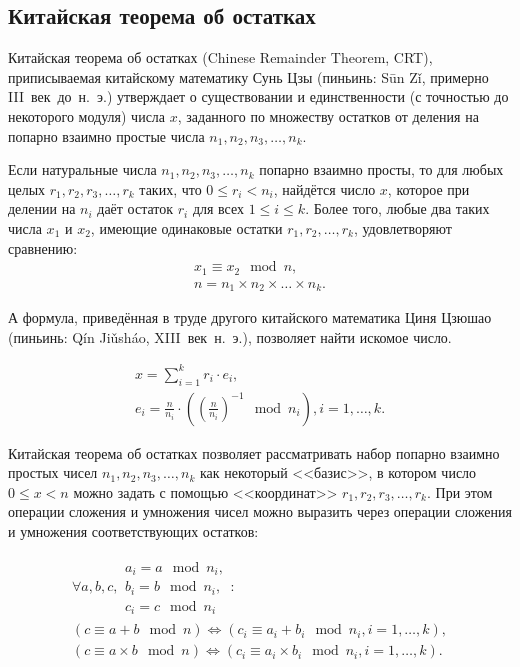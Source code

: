 \subsection{Китайская теорема об остатках}\label{section-chinese-remainder-theorem}

Китайская теорема об остатках (Chinese Remainder Theorem, CRT), приписываемая китайскому математику Сунь Цзы (пиньинь: S\={u}n Z\v{i}, примерно III~век~до~н.~э.) утверждает о существовании и единственности (с точностью до некоторого модуля) числа $x$, заданного по множеству остатков от деления на попарно взаимно простые числа $n_1, n_2, n_3, \dots, n_k$.

\begin{theorem} Если натуральные числа $n_1, n_2, n_3, \dots, n_k$ попарно взаимно просты, то для любых целых $r_1, r_2, r_3, \dots, r_k$ таких, что $0 \leq r_i < n_i$, найдётся число $x$, которое при делении на $n_i$ даёт остаток $r_i$ для всех $1 \leq i \leq k$. Более того, любые два таких числа $x_1$ и $x_2$, имеющие одинаковые остатки $r_1, r_2, \dots, r_k$, удовлетворяют сравнению:
\[ \begin{array}{l}
	x_1 \equiv x_2 \mod n, \\
	n = n_1 \times n_2 \times \dots \times n_k.
\end{array} \]
\end{theorem}

А формула, приведённая в труде другого китайского математика Циня Цзюшао (пиньинь: Q\'{i}n Ji\v{u}sh\'{a}o, XIII~век~н.~э.), позволяет найти искомое число.

\[ \begin{array}{l}
	x = \sum\limits_{i=1}^k r_i \cdot e_i, \\
	e_i = \frac{n}{n_i} \cdot \left( \left(\frac{n}{n_i}\right)^{-1} \mod n_i \right), i = 1, \dots, k.
\end{array} \]

Китайская теорема об остатках позволяет рассматривать набор попарно взаимно простых чисел $n_1, n_2, n_3, \dots, n_k$ как некоторый <<базис>>, в котором число $0 \leq x < n$ можно задать с помощью <<координат>> $r_1, r_2, r_3, \dots, r_k$. При этом операции сложения и умножения чисел можно выразить через операции сложения и умножения соответствующих остатков:

\[ \begin{array}{l}
	\forall a, b, c, \begin{array}{l}
		a_i = a \mod n_i, \\
		b_i = b \mod n_i, \\
		c_i = c \mod n_i
	\end{array}: \\
	\left( c \equiv a + b \mod n \right) \Leftrightarrow \left( c_i \equiv a_i + b_i \mod n_i, i = 1, \dots, k \right), \\
	\left( c \equiv a \times b \mod n \right) \Leftrightarrow \left( c_i \equiv a_i \times b_i \mod n_i, i = 1, \dots, k \right).
\end{array} \]

